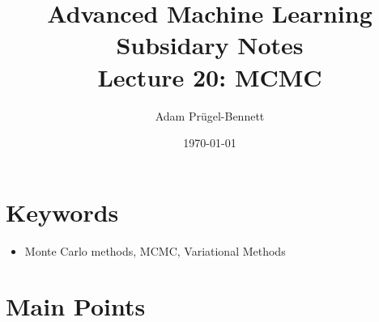 \documentclass[11pt]{article}
\author{Adam Prügel-Bennett}
\date{\today}
\title{Advanced Machine Learning Subsidary Notes\\\medskip
\large Lecture 20: MCMC}
\begin{document}
\maketitle

\section{Keywords}
\label{sec:orgd660a44}
\begin{itemize}
\item Monte Carlo methods, MCMC, Variational Methods
\end{itemize}

\section{Main Points}
\label{sec:orga9dd7d2}
\end{document}
